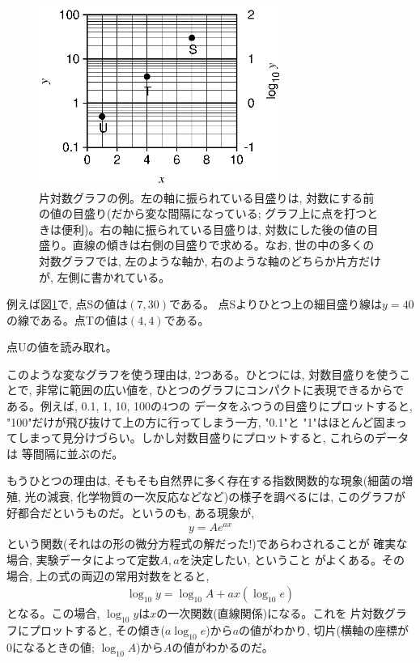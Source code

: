 \begin{figure}[h]
    \centering
    \includegraphics[width=8cm]{log_paper.eps}
    \caption{片対数グラフの例。左の軸に振られている目盛りは, 対数にする前の値の目盛り(だから変な間隔になっている; グラフ上に点を打つときは便利)。右の軸に振られている目盛りは, 対数にした後の値の目盛り。直線の傾きは右側の目盛りで求める。なお, 
世の中の多くの対数グラフでは, 左のような軸か, 右のような軸のどちらか片方だけが, 左側に書かれている。\label{fig:log_graph}}
\end{figure}

例えば図\ref{fig:log_graph}で, 点Sの値は$(7, 30)$である。
点Sよりひとつ上の細目盛り線は$y=40$の線である。点Tの値は$(4, 4)$である。

\begin{q}\label{q:exp_loglingraph0} 点Uの値を読み取れ。\end{q}\mv

このような変なグラフを使う理由は, 2つある。ひとつには, 対数目盛りを使うことで, 
非常に範囲の広い値を, ひとつのグラフにコンパクトに表現できるからである。例えば, 0.1, 1, 10, 100の4つの
データをふつうの目盛りにプロットすると, "100"だけが飛び抜けて上の方に行ってしまう一方, "0.1"と
"1"はほとんど固まってしまって見分けづらい。しかし対数目盛りにプロットすると, これらのデータは
等間隔に並ぶのだ。

もうひとつの理由は, そもそも自然界に多く存在する指数関数的な現象(細菌の増殖, 光の減衰, 
化学物質の一次反応などなど)の様子を調べるには, このグラフが好都合だというものだ。というのも, 
ある現象が, 
\begin{eqnarray}
y=Ae^{ax}\label{eq:loggraph_Aeax}
\end{eqnarray}
という関数(それはの形の微分方程式の解だった!)であらわされることが
確実な場合, 実験データによって定数$A, a$を決定したい, ということ
がよくある。その場合, 上の式の両辺の常用対数をとると, 
\begin{eqnarray}
\log_{10} y=\log_{10} A + ax(\log_{10}e)
\end{eqnarray}
となる。この場合, $\log_{10} y$は$x$の一次関数(直線関係)になる。これを
片対数グラフにプロットすると, その傾き($a\log_{10}e$)から$a$の値がわかり, 切片(横軸の座標が0になるときの値; 
$\log_{10}A$)から$A$の値がわかるのだ。


